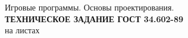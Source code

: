 \documentclass[a4paper,14pt]{extreport}
\begin{document}
    \begin{titlepage}
        \clearpage
        \vspace*{\fill}
        \begin{center}
            \large
            \begin{minipage}{\textwidth}
                \centering
                Игровые программы. Основы проектирования.\\
                \textbf{ТЕХНИЧЕСКОЕ ЗАДАНИЕ ГОСТ 34.602-89}\\
                на \pageref{LastPage} листах
            \end{minipage}
        \end{center}
        \vfill
        \clearpage
    \end{titlepage}
    \tableofcontents
    \newpage
    
\end{document}
